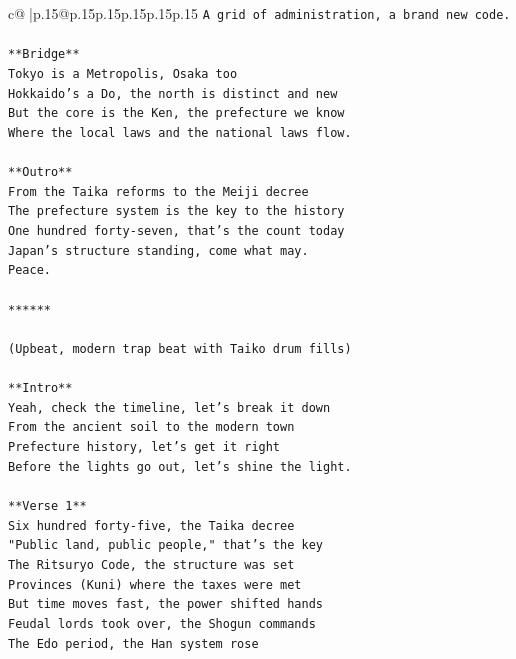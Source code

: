 \documentclass{article}
\begin{document}
{\begin{supertabular}{c@{$\;$}|p{.15\linewidth}@{}p{.15\linewidth}p{.15\linewidth}p{.15\linewidth}p{.15\linewidth}p{.15\linewidth}}
{{{\texttt{A grid of administration, a brand new code.} \\
\\ 
\texttt{**Bridge**} \\
\texttt{Tokyo is a Metropolis, Osaka too} \\
\texttt{Hokkaido's a Do, the north is distinct and new} \\
\texttt{But the core is the Ken, the prefecture we know} \\
\texttt{Where the local laws and the national laws flow.} \\
\\ 
\texttt{**Outro**} \\
\texttt{From the Taika reforms to the Meiji decree} \\
\texttt{The prefecture system is the key to the history} \\
\texttt{One hundred forty{-}seven, that's the count today} \\
\texttt{Japan's structure standing, come what may.} \\
\texttt{Peace.} \\
\\ 
\texttt{******} \\
\\ 
\texttt{(Upbeat, modern trap beat with Taiko drum fills)} \\
\\ 
\texttt{**Intro**} \\
\texttt{Yeah, check the timeline, let's break it down} \\
\texttt{From the ancient soil to the modern town} \\
\texttt{Prefecture history, let's get it right} \\
\texttt{Before the lights go out, let's shine the light.} \\
\\ 
\texttt{**Verse 1**} \\
\texttt{Six hundred forty{-}five, the Taika decree} \\
\texttt{"Public land, public people," that's the key} \\
\texttt{The Ritsuryo Code, the structure was set} \\
\texttt{Provinces (Kuni) where the taxes were met} \\
\texttt{But time moves fast, the power shifted hands} \\
\texttt{Feudal lords took over, the Shogun commands} \\
\texttt{The Edo period, the Han system rose} \\
}}}
\end{supertabular}}
\end{document}
